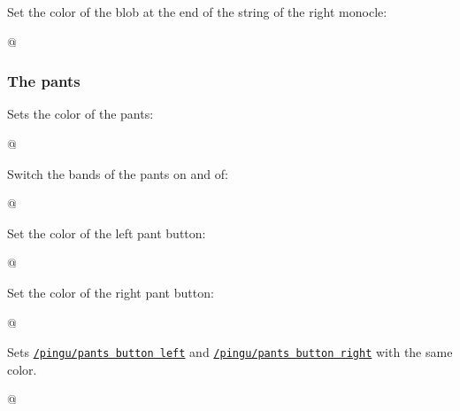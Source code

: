 \documentclass[parskip=half,english,numbers=noenddot,footnotes=nomultiple,oneside]{scrartcl}
\def\lpingu#1{\lstinline[style=lstpingu,language=pingulang]'#1'}
\newcommand*\keyref[2][/pingu/]{\hyperref[pk:#1#2]{\lpingu{#1#2}}}
\begin{document}
{\def\pingu@color@monocleright{<right-monocle-color>}
Set the color of the blob at the end of the string of the right monocle:
\begin{tcblisting}{@}
\begin{tikzpicture}
	\pingu[monocle right,
	       monocle right blob=green]
\end{tikzpicture}
\end{tcblisting}
\endsubkeyexplain}

\subsubsection{The pants}
Sets the color of the pants:
\begin{tcblisting}{@}
\begin{tikzpicture}
	\pingu[pants=green]
\end{tikzpicture}
\end{tcblisting}
\endshowkeyexplain

Switch the bands of the pants on and of:
\begin{tcblisting}{@}
\end{tcblisting}
\endsubkeyexplain


Set the color of the left pant button:
\begin{tcblisting}{@}
\begin{tikzpicture}
	\pingu[pants, pants button left=green]
\end{tikzpicture}
\end{tcblisting}
\endsubkeyexplain

Set the color of the right pant button:
\begin{tcblisting}{@}
\begin{tikzpicture}
	\pingu[pants, pants button right=green]
\end{tikzpicture}
\end{tcblisting}
\endsubkeyexplain

Sets \keyref{pants button left} and \keyref{pants button right} with the same color.
\begin{tcblisting}{@}
\begin{tikzpicture}
	\pingu[pants, pants buttons=green]
\end{tikzpicture}
\end{tcblisting}
\endsubkeyexplain
\end{document}
